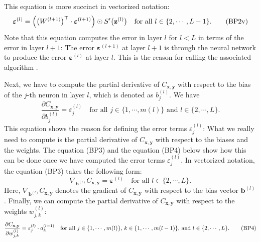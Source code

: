 This equation is more succinct in vectorized notation:
\begin{equation}
  \label{eq:BP2v}
  \boldsymbol{\varepsilon}^{(l)} = \Bigl(\bigl(W^{(l+1)}\bigr)^\top \cdot \boldsymbol{\varepsilon}^{(l+1)}\Bigr) \odot
  S'\bigl(\mathbf{z}^{(l)}\bigr) \quad \mbox{for all $l \in \{2, \cdots, L-1\}$}.
  \tag{BP2v}
\end{equation}
Note that this equation computes the error in layer $l$ for $l < L$ in terms
of the error in layer $l+1$:  The error 
$\boldsymbol{\varepsilon}^{(l+1)}$ at layer $l+1$ is  through the neural network to produce the
error $\boldsymbol{\varepsilon}^{(l)}$ at layer $l$.  This is the reason for calling the associated algorithm
.  


Next, we have to compute the partial derivative of $C_{\mathbf{x}, \mathbf{y}}$ with respect to the bias of the
$j$-th neuron in layer $l$, which is denoted as $b_j^{(l)}$.  We have
\begin{equation}
  \label{eq:BP3}
  \frac{\partial C_{\mathbf{x}, \mathbf{y}}}{\partial b_j^{(l)}} = \varepsilon_j^{(l)}
  \quad \mbox{for all $j \in \{1,\cdots,m(l)\}$ and $l \in \{2, \cdots,L\}$.}
  \tag{BP3}
\end{equation}
This equation shows the reason for defining the error terms $\varepsilon_j^{(l)}$:  What we really need to
compute is the partial derivative of $C_{\mathbf{x},\mathbf{y}}$ with respect to the biases and the weights.
The equation (BP3) and the equation (BP4) below show how this can be done once we have computed the error terms
$\varepsilon_j^{(l)}$.  In vectorized notation, the equation (BP3) takes the following form:
\begin{equation}
  \label{eq:BP3v}
  \nabla_{\mathbf{b}^{(l)}} C_{\mathbf{x}, \mathbf{y}} = \boldsymbol{\varepsilon}^{(l)}
  \quad \mbox{for all $l \in \{2, \cdots,L\}$.}
  \tag{BP3v}
\end{equation}
Here, $\nabla_{\mathbf{b}^{(l)}} C_{\mathbf{x}, \mathbf{y}}$ denotes the gradient of $C_{\mathbf{x},
  \mathbf{y}}$ with respect to the bias vector $\mathbf{b}^{(l)}$.
Finally, we can compute the  partial derivative of $C_{\mathbf{x}, \mathbf{y}}$ with respect to the weights $w_{j,k}^{(l)}$:
\begin{equation}
  \label{eq:BP4}
  \frac{\partial C_{\mathbf{x}, \mathbf{y}}}{\partial w_{j,k}^{(l)}} = \varepsilon_j^{(l)} \cdot a_k^{(l-1)} 
  \quad \mbox{for all $j \in \{1,\cdots,m(l)\}$, $ k \in \{1,\cdots,m(l-1)\}$, and $l \in \{2, \cdots,L\}$.}
  \tag{BP4}
\end{equation}

